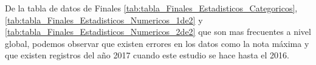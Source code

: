 



De la tabla de datos de Finales \ref{tab:tabla_Finales_Estadisticos_Categoricos}, \ref{tab:tabla_Finales_Estadisticos_Numericos_1de2} y \ref{tab:tabla_Finales_Estadisticos_Numericos_2de2} que son mas frecuentes a nivel global, podemos observar que existen errores en los datos como la nota máxima y que existen registros del año 2017 cuando este estudio se hace hasta el 2016.



